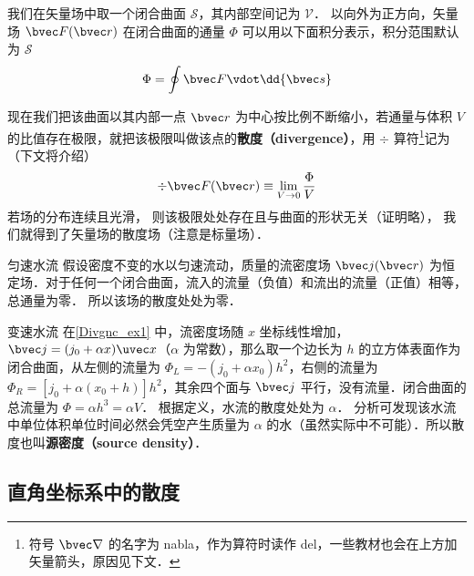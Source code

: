

我们在矢量场中取一个闭合曲面 $\mathcal{S}$，其内部空间记为 $\mathcal{V}$． 以向外为正方向，矢量场 $\bvec F(\bvec r)$ 在闭合曲面的通量 $\Phi$ 可以用以下面积分表示，积分范围默认为 $\mathcal{S}$
\begin{equation}\label{Divgnc_eq1}
\Phi  = \oint \bvec F \vdot \dd{\bvec s}
\end{equation}

现在我们把该曲面以其内部一点 $\bvec r$ 为中心按比例不断缩小，若通量与体积 $V$ 的比值存在极限，就把该极限叫做该点的\textbf{散度（divergence）}，用 $\div$ 算符\footnote{符号 $\bvec\nabla$ 的名字为 nabla，作为算符时读作 del，一些教材也会在上方加矢量箭头，原因见下文．}记为（下文将介绍）
\begin{equation}\label{Divgnc_eq2}
\div \bvec F(\bvec r) \equiv \lim_{V \to 0} \frac{\Phi }{V}
\end{equation}
若场的分布连续且光滑， 则该极限处处存在且与曲面的形状无关（证明略）， 我们就得到了矢量场的散度场（注意是标量场）．

\begin{example}{匀速水流}\label{Divgnc_ex1}
假设密度不变的水以匀速流动，质量的流密度场 $\bvec j(\bvec r)$ 为恒定场．对于任何一个闭合曲面，流入的流量（负值）和流出的流量（正值）相等，总通量为零． 所以该场的散度处处为零．
\end{example}

\begin{example}{变速水流}
在\autoref{Divgnc_ex1} 中，流密度场随 $x$ 坐标线性增加， $\bvec j = (j_0 + \alpha x)\uvec x$（$\alpha$ 为常数），那么取一个边长为 $h$ 的立方体表面作为闭合曲面，从左侧的流量为 $\Phi_L =  - (j_0 + \alpha x_0) h^2$，右侧的流量为 $\Phi_R = [j_0 + \alpha (x_0 + h)] h^2$，其余四个面与 $\bvec j$ 平行，没有流量．闭合曲面的总流量为 $\Phi  = \alpha h^3 = \alpha V$． 根据定义，水流的散度处处为 $\alpha$． 分析可发现该水流中单位体积单位时间必然会凭空产生质量为 $\alpha$ 的水（虽然实际中不可能）．所以散度也叫\textbf{源密度（source density）}．
\end{example}

\subsection{直角坐标系中的散度}

